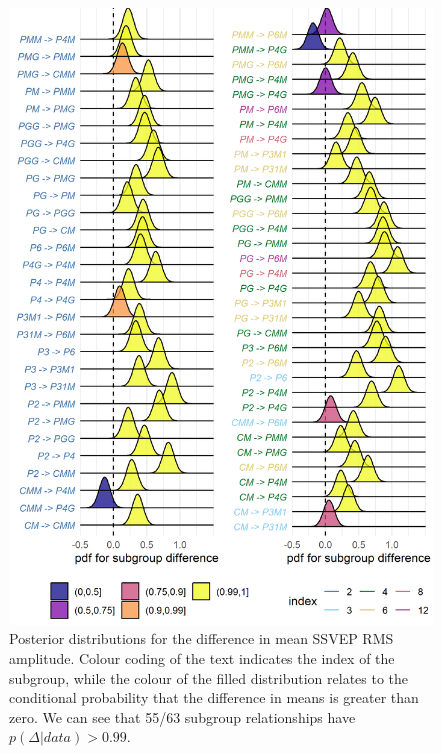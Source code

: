 \documentclass[11pt, twoside]{article}
\begin{document}
\begin{figure}[hp]
\centering
\includegraphics[width=0.75\linewidth]{../analysis/plots/subgroup_comp_eeg_rms.png}
\caption{Posterior distributions for the difference in mean SSVEP RMS amplitude. Colour coding of the text indicates the index of the subgroup, while the colour of the filled distribution relates to the conditional probability that the difference in means is greater than zero. We can see that 55/63 subgroup relationships have $p(\Delta|data)>0.99$.}
\label{fig:eeg_comp}
\end{figure}
\end{document}
